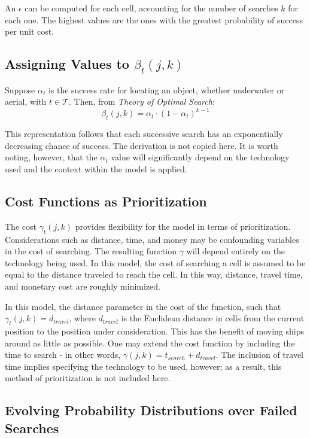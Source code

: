 \documentclass[a4paper]{article}
\begin{document}
An $\epsilon$ can be computed for each cell, accounting for the number of searches $k$ for each one. The highest values are the ones with the greatest probability of success per unit cost. 

\subsection{Assigning Values to $\beta_t(j,k)$}

Suppose $\alpha_t$ is the success rate for locating an object, whether underwater or aerial, with $t\in\mathcal{T}$. Then, from \textit{Theory of Optimal Search}: \[\beta_t(j,k)=\alpha_t\cdot(1-\alpha_t)^{k-1}\]

This representation follows that each successive search has an exponentially decreasing chance of success. The derivation is not copied here. It is worth noting, however, that the $\alpha_t$ value will significantly depend on the technology used and the context within the model is applied.

\subsection{Cost Functions as Prioritization}

The cost $\gamma_t(j,k)$ provides flexibility for the model in terms of prioritization. Considerations such as distance, time, and money may be confounding variables in the cost of searching. The resulting function $\gamma$ will depend entirely on the technology being used. In this model, the cost of searching a cell is assumed to be equal to the distance traveled to reach the cell. In this way, distance, travel time, and monetary cost are roughly minimized.

In this model, the distance parameter in the cost of the function, such that $\gamma_t(j,k)=d_{travel}$, where $d_{travel}$ is the Euclidean distance in cells from the current position to the position under consideration. This has the benefit of moving ships around as little as possible. One may extend the cost function by including the time to search - in other words, $\gamma(j,k)=t_{search}+d_{travel}$. The inclusion of travel time implies specifying the technology to be used, however; as a result, this method of prioritization is not included here.  

\subsection{Evolving Probability Distributions over Failed Searches}
\end{document}

